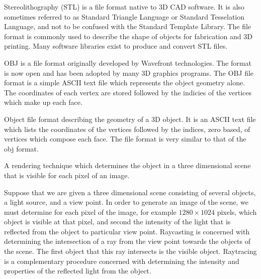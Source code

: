

{%
Stereolithography (STL) is a file format native to 3D CAD software.
It is also sometimes referred to as Standard Triangle Language or Standard Tesselation Language, and not to be confused with the Standard Template Library.
The file format is commonly used to describe the shape of objects for fabrication and 3D printing.
Many software libraries exist to produce and convert STL files.
}

{
    OBJ is a file format originally developed by Wavefront technologies.
    The format is now open and has been adopted by many 3D graphics programs.
    The OBJ file format is a simple ASCII text file which represents the object geometry alone.
    The coordinates of each vertex are stored followed by the indicies of the vertices which make up each face.
}

{%
Object file format describing the geometry of a 3D object.
It is an ASCII text file which lists the coordinates of the vertices followed by the indices, zero based, of vertices which compose each face.
The file format is very similar to that of the \gls{obj} format.
}

{%
    A rendering technique which determines the object in a three dimensional scene that is visible for each pixel of an image.

    Suppose that we are given a three dimensional scene consisting of several objects, a light source, and a view point.
    In order to generate an image of the scene, we must determine for each pixel of the image, for example \( 1280 \times 1024\) pixels, which object is visible at that pixel, and second the intensity of the light that is reflected from the object to particular view point.
    Raycasting is concerned with determining the intersection of a ray from the view point towards the objects of the scene.
    The first object that this ray intersects is the visible object.
    Raytracing is a complementary procedure concerned with determining the intensity and properties of the reflected light from the object.
}

